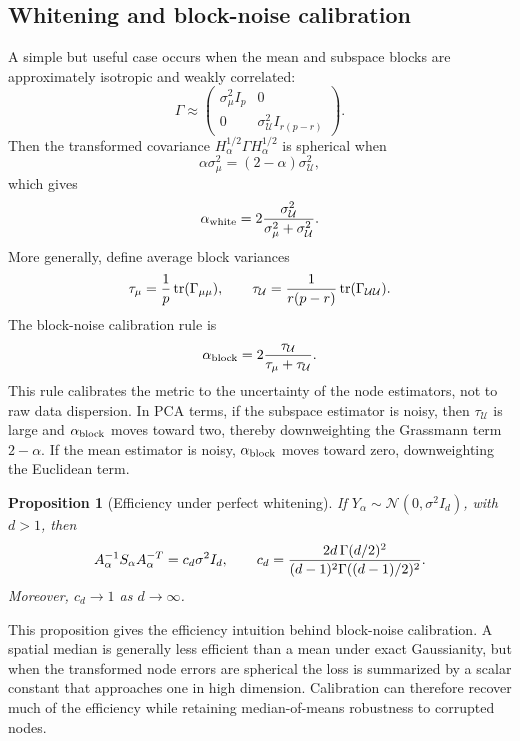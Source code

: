 \documentclass[11pt]{article}
\newtheorem{proposition}[theorem]{Proposition}
\newcommand{\tr}{\operatorname{tr}}
\newcommand{\Normal}{\mathcal N}
\newcommand{\U}{\mathcal U}
\begin{document}
\subsection{Whitening and block-noise calibration}

A simple but useful case occurs when the mean and subspace blocks are approximately isotropic and weakly correlated:
\[
    \Gamma\approx\begin{pmatrix}
        \sigma_\mu^2 I_p & 0\\
        0 & \sigma_\U^2 I_{r(p-r)}
    \end{pmatrix}.
\]
Then the transformed covariance \(H_\alpha^{1/2}\Gamma H_\alpha^{1/2}\) is spherical when
\[
    \alpha\sigma_\mu^2=(2-\alpha)\sigma_\U^2,
\]
which gives
\begin{equation}\label{eq:alpha-white}
    \alpha_{\rm white}=2{\sigma_\U^2\over \sigma_\mu^2+\sigma_\U^2}.
\end{equation}
More generally, define average block variances
\begin{equation}\label{eq:tau-blocks}
    \tau_\mu={1\over p}\tr(\Gamma_{\mu\mu}),
    \qquad
    \tau_\U={1\over r(p-r)}\tr(\Gamma_{\U\U}).
\end{equation}
The block-noise calibration rule is
\begin{equation}\label{eq:alpha-block}
    \alpha_{\rm block}=2{\tau_\U\over \tau_\mu+\tau_\U}.
\end{equation}
This rule calibrates the metric to the uncertainty of the node estimators, not to raw data dispersion.  In PCA terms, if the subspace estimator is noisy, then \(\tau_\U\) is large and \(\alpha_{\rm block}\) moves toward two, thereby downweighting the Grassmann term \(2-\alpha\).  If the mean estimator is noisy, \(\alpha_{\rm block}\) moves toward zero, downweighting the Euclidean term.

\begin{proposition}[Efficiency under perfect whitening]\label{prop:efficiency-whitening}
If \(Y_\alpha\sim\Normal(0,\sigma^2I_d)\), with \(d>1\), then
\begin{equation}\label{eq:cd-constant}
    A_\alpha^{-1}S_\alpha A_\alpha^{-T}=c_d\sigma^2I_d,
    \qquad
    c_d={2d\,\Gamma(d/2)^2\over (d-1)^2\Gamma((d-1)/2)^2}.
\end{equation}
Moreover, \(c_d\to1\) as \(d\to\infty\).
\end{proposition}

This proposition gives the efficiency intuition behind block-noise calibration.  A spatial median is generally less efficient than a mean under exact Gaussianity, but when the transformed node errors are spherical the loss is summarized by a scalar constant that approaches one in high dimension.  Calibration can therefore recover much of the efficiency while retaining median-of-means robustness to corrupted nodes.
\end{document}
